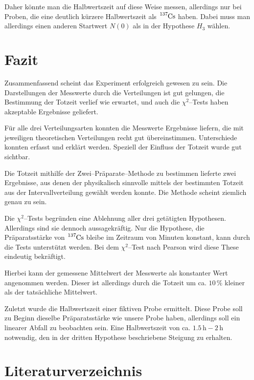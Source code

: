 \documentclass[12pt,a4paper]{scrartcl}
\numberwithin{equation}{section} %
\begin{document}
Daher könnte man die Halbwertszeit auf diese Weise messen, allerdings nur bei Proben, die eine deutlich kürzere Halbwertszeit als $\ce{^{137}Cs}$ haben. Dabei muss man allerdings einen anderen Startwert $N(0)$ als in der Hypothese $H_3$ wählen.

\clearpage
\hypertarget{fazit}{%
\section{Fazit}\label{fazit}}
Zusammenfassend scheint das Experiment erfolgreich gewesen zu sein. Die Darstellungen der Messwerte durch die Verteilungen ist gut gelungen, die Bestimmung der Totzeit verlief wie erwartet, und auch die $\chi^2$--Tests haben akzeptable Ergebnisse geliefert.

Für alle drei Verteilungsarten konnten die Messwerte Ergebnisse liefern, die mit jeweiligen theoretischen Verteilungen recht gut übereinstimmen. Unterschiede konnten erfasst und erklärt werden. Speziell der Einfluss der Totzeit wurde gut sichtbar.

Die Totzeit mithilfe der Zwei--Präparate--Methode zu bestimmen lieferte zwei Ergebnisse, aus denen der physikalisch sinnvolle mittels der bestimmten Totzeit aus der Intervallverteilung gewählt werden konnte. Die Methode scheint ziemlich genau zu sein.

Die $\chi^2$--Tests begründen eine Ablehnung aller drei getätigten Hypothesen. Allerdings sind sie dennoch aussagekräftig. Nur die Hypothese, die Präparatsstärke von $\ce{^{137}Cs}$ bleibe im Zeitraum von Minuten konstant, kann durch die Tests unterstützt werden. Bei dem $\chi^2$--Test nach Pearson wird diese These eindeutig bekräftigt.

Hierbei kann der gemessene Mittelwert der Messwerte als konstanter Wert angenommen werden. Dieser ist allerdings durch die Totzeit um ca. $10\,\%$ kleiner als der tatsächliche Mittelwert.

Zuletzt wurde die Halbwertszeit einer fiktiven Probe ermittelt. Diese Probe soll zu Beginn dieselbe Präparatsstärke wie unsere Probe haben, allerdings soll ein linearer Abfall zu beobachten sein. Eine Halbwertszeit von ca. $1.5\mathrm{\,h}-2\mathrm{\,h}$ notwendig, den in der dritten Hypothese beschriebene Steigung zu erhalten.

\clearpage
\hypertarget{literatur}{\section{Literaturverzeichnis}\label{literatur}}
\renewcommand{\section}[2]{}
\end{document}
